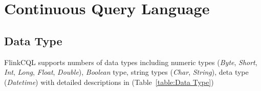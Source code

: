 

\section{Continuous Query Language} \label{language}

\subsection{Data Type}

FlinkCQL supports numbers of data types including numeric types (\textit{Byte}, \textit{Short}, \textit{Int}, \textit{Long}, \textit{Float}, \textit{Double}), \textit{Boolean}  type, string types (\textit{Char}, \textit{String}), deta type (\textit{Datetime}) with detailed descriptions in (Table~\ref{table:Data Type})



